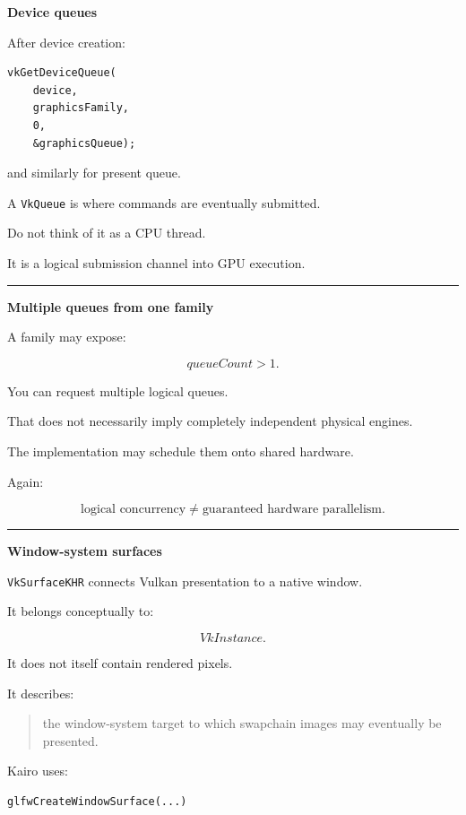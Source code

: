 \textbf{Device queues}

After device creation:

\begin{verbatim}
vkGetDeviceQueue(
    device,
    graphicsFamily,
    0,
    &graphicsQueue);
\end{verbatim}

and similarly for present queue.

A \texttt{VkQueue} is where commands are eventually submitted.

Do not think of it as a CPU thread.

It is a logical submission channel into GPU execution.

\begin{center}\rule{0.5\linewidth}{0.5pt}\end{center}

\textbf{Multiple queues from one family}

A family may expose:

\[
queueCount>1.
\]

You can request multiple logical queues.

That does not necessarily imply completely independent physical engines.

The implementation may schedule them onto shared hardware.

Again:

\[
\boxed{
\text{logical concurrency}
\neq
\text{guaranteed hardware parallelism}.
}
\]

\begin{center}\rule{0.5\linewidth}{0.5pt}\end{center}

\textbf{Window-system surfaces}

\texttt{VkSurfaceKHR} connects Vulkan presentation to a native window.

It belongs conceptually to:

\[
VkInstance.
\]

It does not itself contain rendered pixels.

It describes:

\begin{quote}
the window-system target to which swapchain images may eventually be presented.
\end{quote}

Kairo uses:

\begin{verbatim}
glfwCreateWindowSurface(...)
\end{verbatim}

